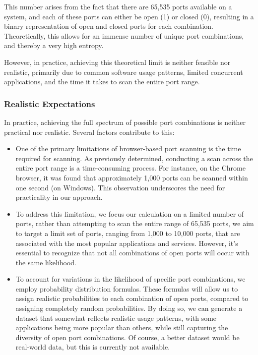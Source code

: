 This number arises from the fact that there are 65,535 ports available on a system, and each of these ports can either be open (1) or closed (0), resulting in a binary representation of open and closed ports for each combination. Theoretically, this allows for an immense number of unique port combinations, and thereby a very high entropy.

However, in practice, achieving this theoretical limit is neither feasible nor realistic, primarily due to common software usage patterns, limited concurrent applications, and the time it takes to scan the entire port range.

\subsubsection{Realistic Expectations}

In practice, achieving the full spectrum of possible port combinations is neither practical nor realistic. Several factors contribute to this:

\begin{itemize}
\item One of the primary limitations of browser-based port scanning is the time required for scanning. As previously determined, conducting a scan across the entire port range is a time-consuming process. For instance, on the Chrome browser, it was found that approximately 1,000 ports can be scanned within one second (on Windows). This observation underscores the need for practicality in our approach.

\item To address this limitation, we focus our calculation on a limited number of ports, rather than attempting to scan the entire range of 65,535 ports, we aim to target a limit set of ports, ranging from 1,000 to 10,000 ports, that are associated with the most popular applications and services. However, it's essential to recognize that not all combinations of open ports will occur with the same likelihood.

\item To account for variations in the likelihood of specific port combinations, we employ probability distribution formulas. These formulas will allow us to assign realistic probabilities to each combination of open ports, compared to assigning completely random probabilities. By doing so, we can generate a dataset that somewhat reflects realistic usage patterns, with some applications being more popular than others, while still capturing the diversity of open port combinations. Of course, a better dataset would be real-world data, but this is currently not available.
\end{itemize}

